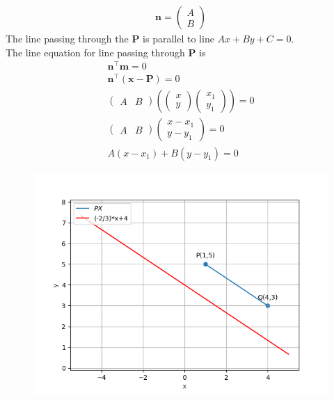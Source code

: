\documentclass[10pt]{article}
\providecommand{\brak}[1]{\ensuremath{\left(#1\right)}}
\newcommand{\myvec}[1]{\ensuremath{\begin{pmatrix}#1\end{pmatrix}}}
\let\vec\mathbf{}
\begin{document}
\begin{enumerate}
\begin{align}
\vec{n}=\myvec{A\\B}
\end{align}
The line passing through the $\vec{P}$ is parallel to line $Ax+By+C=0$.\\
The line equation for line passing through $\vec{P}$ is
\begin{align}
\vec{n}^{\top}\vec{m}=0\\
\vec{n}^\top\brak{\vec{x}-\vec{P}}=0\\
\myvec{A&B}\brak{\myvec{x\\y}\myvec{x_1\\y_1}}=0\\
\myvec{A&B}\myvec{x-x_1\\y-y_1}=0\\
A(x-x_1)+B(y-y_1)=0
\end{align}
\begin{figure}[!h]
	\begin{center}
		\includegraphics[width=\columnwidth]{./figs/fig.png}
	\end{center}
\caption{}
\end{figure}

\end{enumerate}
\end{document}
